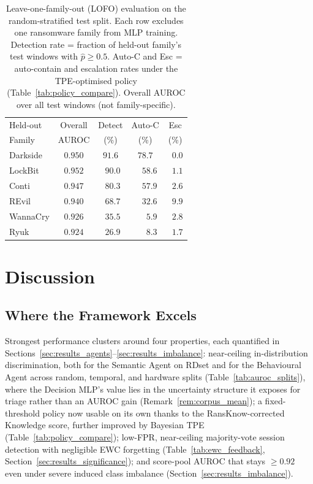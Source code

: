 \documentclass[journal]{IEEEtran}
\begin{document}
\begin{table}[t]
\centering
\footnotesize
\caption{Leave-one-family-out (LOFO) evaluation on the random-stratified test split.
  Each row excludes one ransomware family from MLP training.
  Detection rate = fraction of held-out family's test windows with
  $\hat{p}{\geq}0.5$.
  Auto-C and Esc = auto-contain and escalation rates under the TPE-optimised
  policy (Table~\ref{tab:policy_compare}).
  Overall AUROC over all test windows (not family-specific).
}
\label{tab:lofo}
\setlength{\tabcolsep}{4pt}
\begin{tabular}{lcccc}
\toprule
Held-out & Overall & Detect & Auto-C & Esc \\
Family   & AUROC   & (\%)   & (\%)   & (\%) \\
\midrule
Darkside & $0.950$ & $\mathbf{91.6}$ & $\mathbf{78.7}$ & $\phantom{0}0.0$ \\
LockBit  & $0.952$ & $\phantom{0}90.0$ & $\phantom{00}58.6$ & $\phantom{0}1.1$ \\
Conti    & $0.947$ & $\phantom{0}80.3$ & $\phantom{00}57.9$ & $\phantom{0}2.6$ \\
REvil    & $0.940$ & $\phantom{0}68.7$ & $\phantom{00}32.6$ & $\phantom{0}9.9$ \\
WannaCry & $0.926$ & $\phantom{0}35.5$ & $\phantom{000}5.9$ & $\phantom{0}2.8$ \\
Ryuk     & $0.924$ & $\phantom{0}26.9$ & $\phantom{000}8.3$ & $\phantom{0}1.7$ \\
\bottomrule
\end{tabular}
\end{table}

\section{Discussion}\label{sec:discussion}

\subsection{Where the Framework Excels}

Strongest performance clusters around four properties, each quantified in
Sections~\ref{sec:results_agents}--\ref{sec:results_imbalance}: near-ceiling
in-distribution discrimination, both for the Semantic Agent on RDset and
for the Behavioural Agent across random, temporal, and hardware splits
(Table~\ref{tab:auroc_splits}), where the Decision MLP's value lies in the
uncertainty structure it exposes for triage rather than an AUROC gain
(Remark~\ref{rem:corpus_mean}); a fixed-threshold policy now usable on its
own thanks to the RansKnow-corrected Knowledge score, further improved by
Bayesian TPE (Table~\ref{tab:policy_compare}); low-FPR, near-ceiling
majority-vote session detection with negligible EWC forgetting
(Table~\ref{tab:ewc_feedback}, Section~\ref{sec:results_significance}); and
score-pool AUROC that stays $\geq 0.92$ even under severe induced class
imbalance (Section~\ref{sec:results_imbalance}).
\end{document}
